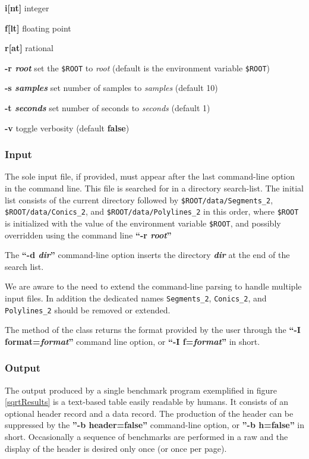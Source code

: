 \begin{list}{}
\begin{list}{}
\begin{list}{}
{	  \settowidth{\listparindent}{abcdefg}
	}
	\item[\bf{i[nt]}\hfill] integer
	\item[\bf{f[lt]}\hfill] floating point
	\item[\bf{r[at]}\hfill] rational
      \end{list}
  \end{list}
\item[\bf{-r {\em root}}\hfill]
  set the {\tt \$ROOT} to {\em root} (default is the environment
  variable {\tt \$ROOT})
\item[\bf{-s {\em samples}}\hfill]
  set number of samples to {\em samples} (default 10)
\item[\bf{-t {\em seconds}}\hfill]
  set number of seconds to {\em seconds} (default 1)
\item[\bf{-v}\hfill]
  toggle verbosity (default \textbf{false})
\end{list}

\subsubsection{Input}
The sole input file, if provided, must appear after the last
command-line option in the command line. This file is searched for in
a directory search-list. The initial list consists of the current
directory followed by {\tt \$ROOT/data/Segments\_2},
{\tt \$ROOT/data/Conics\_2}, and {\tt \$ROOT/data/Polylines\_2} in
this order, where {\tt \$ROOT} is initialized with the value of the
environment variable {\tt \$ROOT}, and possibly overridden using the
command line \textbf{``-r {\em root}''}

The \textbf{``-d {\em dir}''} command-line option inserts the
directory \textbf{\em dir} at the end of the search list.

We are aware to the need to extend the command-line parsing to handle
multiple input files. In addition the dedicated names
{\tt Segments\_2}, {\tt Conics\_2}, and {\tt Polylines\_2} should be
removed or extended.

The  method of the
 class returns the format provided
by the user through the \textbf{``-I format={\em format}''} command
line option, or \textbf{``-I f={\em format}''} in short.

\subsubsection{Output}
The output produced by a single benchmark program exemplified in
figure \ref{sqrtResults} is a text-based table easily readable by
humans. It consists of an optional header record and a data
record. The production of the header can be suppressed by the
\textbf{''-b header=false''} command-line option, or
\textbf{''-b h=false''} in short. Occasionally a sequence of
benchmarks are performed in a raw and the display of the header is
desired only once (or once per page).

